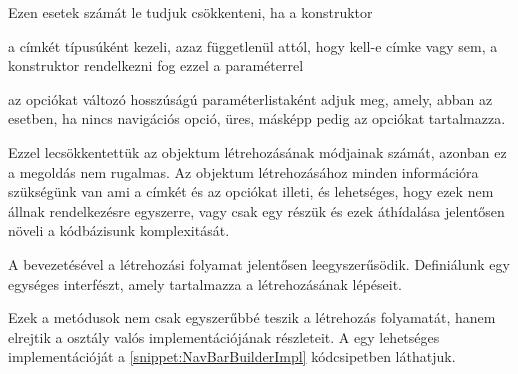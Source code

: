 Ezen esetek számát le tudjuk csökkenteni, ha a konstruktor \par

\begin{listing}
	\item a címkét  típusúként kezeli, azaz függetlenül attól, hogy kell-e címke vagy sem, a konstruktor rendelkezni fog ezzel a paraméterrel
	\item az opciókat változó hosszúságú paraméterlistaként adjuk meg, amely, abban az esetben, ha nincs navigációs opció, üres, másképp pedig az opciókat tartalmazza.
\end{listing} \par


Ezzel lecsökkentettük az objektum létrehozásának módjainak számát, azonban ez a megoldás nem rugalmas. Az objektum létrehozásához minden információra szükségünk van ami a címkét és az opciókat illeti, és lehetséges, hogy ezek nem állnak rendelkezésre egyszerre, vagy csak egy részük és ezek áthídalása jelentősen növeli a kódbázisunk komplexitását. \par

A  bevezetésével a létrehozási folyamat jelentősen leegyszerűsödik. Definiálunk egy egységes interfészt, amely tartalmazza a  létrehozásának lépéseit.


Ezek a metódusok nem csak egyszerűbbé teszik a létrehozás folyamatát, hanem elrejtik a  osztály valós implementációjának részleteit. A  egy lehetséges implementációját a \ref{snippet:NavBarBuilderImpl} kódcsipetben láthatjuk.

